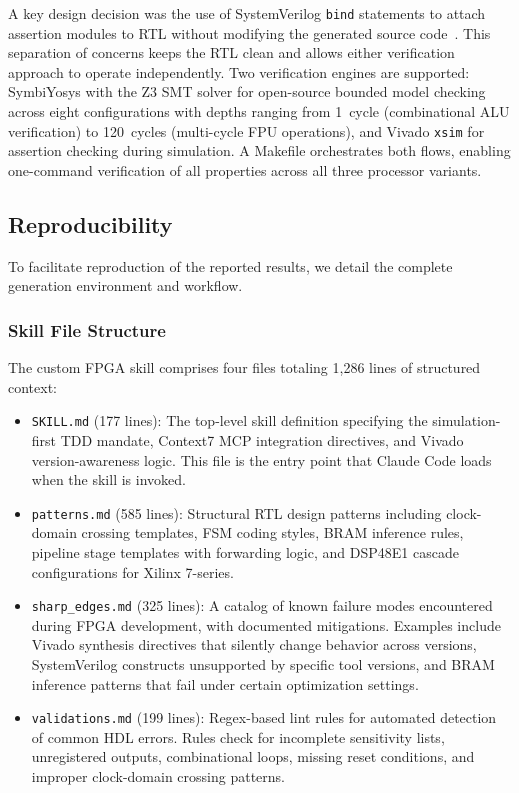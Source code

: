 \documentclass[journal]{IEEEtran}
\begin{document}
A key design decision was the use of SystemVerilog \texttt{bind}
statements to attach assertion modules to RTL without modifying the
generated source code~\cite{ieee1800_2017}.  This separation of concerns
keeps the RTL clean and allows either verification approach to operate
independently.  Two verification engines are supported: SymbiYosys with
the Z3 SMT solver for open-source bounded model checking across eight
configurations with depths ranging from 1~cycle (combinational ALU
verification) to 120~cycles (multi-cycle FPU operations), and Vivado
\texttt{xsim} for assertion checking during simulation.  A Makefile
orchestrates both flows, enabling one-command verification of all
properties across all three processor variants.

\subsection{Reproducibility}
\label{sec:reproducibility}

To facilitate reproduction of the reported results, we detail the
complete generation environment and workflow.

\subsubsection{Skill File Structure}
The custom FPGA skill comprises four files totaling 1,286 lines of
structured context:
\begin{itemize}[leftmargin=*]
\item \texttt{SKILL.md} (177 lines): The top-level skill definition
      specifying the simulation-first TDD mandate, Context7 MCP
      integration directives, and Vivado version-awareness logic.  This
      file is the entry point that Claude Code loads when the skill is
      invoked.
\item \texttt{patterns.md} (585 lines): Structural RTL design patterns
      including clock-domain crossing templates, FSM coding styles,
      BRAM inference rules, pipeline stage templates with forwarding
      logic, and DSP48E1 cascade configurations for Xilinx 7-series.
\item \texttt{sharp\_edges.md} (325 lines): A catalog of known failure
      modes encountered during FPGA development, with documented
      mitigations.  Examples include Vivado synthesis directives that
      silently change behavior across versions, SystemVerilog constructs
      unsupported by specific tool versions, and BRAM inference patterns
      that fail under certain optimization settings.
\item \texttt{validations.md} (199 lines): Regex-based lint rules for
      automated detection of common HDL errors.  Rules check for
      incomplete sensitivity lists, unregistered outputs,
      combinational loops, missing reset conditions, and improper
      clock-domain crossing patterns.
\end{itemize}
\end{document}
